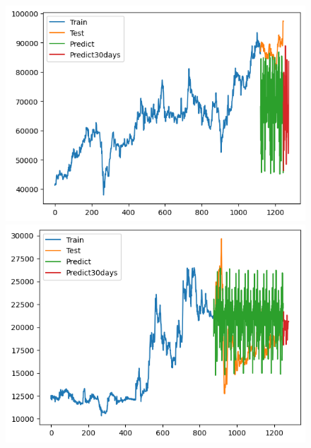 \begin{figure}[H]
\begin{minipage}{0.15\textwidth}
    \end{minipage}
    \hfill
        \begin{minipage}{0.15\textwidth}
    \centering
    \includegraphics[width=1\textwidth]{resources/chapter-5/result/VCB_ML_9_1.png}
    \end{minipage}
    \hfill
    \begin{minipage}{0.15\textwidth}
    \centering
    \includegraphics[width=1\textwidth]{resources/chapter-5/result/EXB_ML_7_3.png}
    \end{minipage}
    \hfill
    \begin{minipage}{0.15\textwidth}
    \centering

\end{minipage}
\end{figure}
